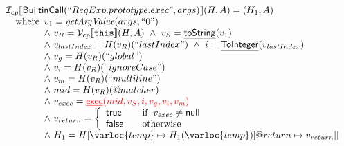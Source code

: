 \[\begin{array}{l}
\I_{cp}\lbr \SF{BuiltinCall}(``RegExp.prototype.exec", args)\rbr(H,A)
= (H_1, A)\\
\quad\wherec{
   v_{1} = \hf{getArgValue}(args, ``0")\\
   \land~ v_R = \V _{cp}\lbr \TT{this}\rbr (H,A)
   ~\land~ v_S = \chf{toString}(v_1)\\
   \land~ v_{lastIndex} = H(v_R)(``lastIndex") ~\land~ i = \chf{ToInteger}(v_{lastIndex}) \\
   \land~ v_{g} = H(v_R)(``global")\\
   \land~ v_{i} = H(v_R)(``ignoreCase")\\
   \land~ v_{m} = H(v_R)(``multiline")\\
   \land~ mid = H(v_R)(\varprop{matcher})\\
   \land~ v_{exec} = {\inred\chf{exec}(mid, v_S, i, v_{g}, v_{i}, v_{m})}\\
   \land~ v_{return} = \left\{
     \begin{array}{ll}
       \SF{true} & \quad\ifc{v_{exec} \neq \SF{null}} \\
       \SF{false} & \quad\owc \\
     \end{array}
   \right.\\
   \land~ H_1 = H[\varloc{temp}\mapsto H_1(\varloc{temp})[\varprop{return}\mapsto v_{return}]]
}\\\\


\end{array}\]
